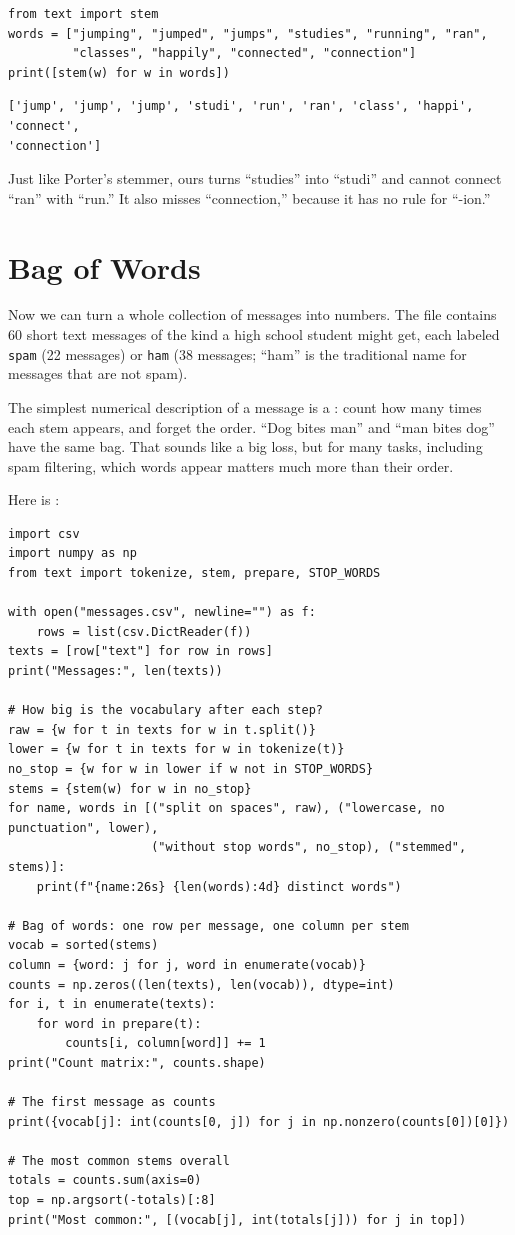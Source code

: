 \begin{verbatim}
from text import stem
words = ["jumping", "jumped", "jumps", "studies", "running", "ran",
         "classes", "happily", "connected", "connection"]
print([stem(w) for w in words])
\end{verbatim}
\begin{verbatim}
['jump', 'jump', 'jump', 'studi', 'run', 'ran', 'class', 'happi', 'connect',
'connection']
\end{verbatim}
Just like Porter's stemmer, ours turns ``studies'' into ``studi'' and cannot connect ``ran'' with ``run.''
It also misses ``connection,'' because it has no rule for ``-ion.''

\section{Bag of Words}
Now we can turn a whole collection of messages into numbers. The file  contains 60 short
text messages of the kind a high school student might get, each labeled \verb|spam| (22 messages) or \verb|ham|
(38 messages; ``ham'' is the traditional name for messages that are not spam).

The simplest numerical description of a message is a : count how many times each stem
appears, and forget the order. ``Dog bites man'' and ``man bites dog'' have the same bag. That sounds like a big
loss, but for many tasks, including spam filtering, which words appear matters much more than their order.

Here is :

\begin{verbatim}
import csv
import numpy as np
from text import tokenize, stem, prepare, STOP_WORDS

with open("messages.csv", newline="") as f:
    rows = list(csv.DictReader(f))
texts = [row["text"] for row in rows]
print("Messages:", len(texts))

# How big is the vocabulary after each step?
raw = {w for t in texts for w in t.split()}
lower = {w for t in texts for w in tokenize(t)}
no_stop = {w for w in lower if w not in STOP_WORDS}
stems = {stem(w) for w in no_stop}
for name, words in [("split on spaces", raw), ("lowercase, no punctuation", lower),
                    ("without stop words", no_stop), ("stemmed", stems)]:
    print(f"{name:26s} {len(words):4d} distinct words")

# Bag of words: one row per message, one column per stem
vocab = sorted(stems)
column = {word: j for j, word in enumerate(vocab)}
counts = np.zeros((len(texts), len(vocab)), dtype=int)
for i, t in enumerate(texts):
    for word in prepare(t):
        counts[i, column[word]] += 1
print("Count matrix:", counts.shape)

# The first message as counts
print({vocab[j]: int(counts[0, j]) for j in np.nonzero(counts[0])[0]})

# The most common stems overall
totals = counts.sum(axis=0)
top = np.argsort(-totals)[:8]
print("Most common:", [(vocab[j], int(totals[j])) for j in top])
\end{verbatim}

